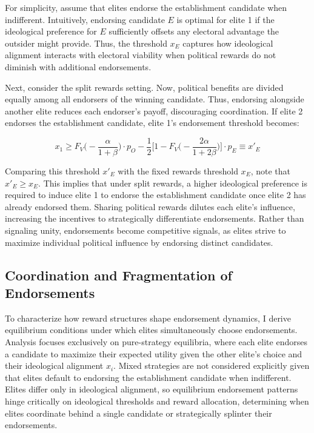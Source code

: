 For simplicity, assume that elites endorse the establishment candidate when indifferent. Intuitively, endorsing candidate $E$ is optimal for elite 1 if the ideological preference for $E$ sufficiently offsets any electoral advantage the outsider might provide. Thus, the threshold $x_E$ captures how ideological alignment interacts with electoral viability when political rewards do not diminish with additional endorsements.

Next, consider the split rewards setting. Now, political benefits are divided equally among all endorsers of the winning candidate. Thus, endorsing alongside another elite reduces each endorser’s payoff, discouraging coordination. If elite 2 endorses the establishment candidate, elite 1’s endorsement threshold becomes:

\[x_1 \geq F_V\bigg(-\frac{\alpha}{1+\beta}\bigg)\cdot p_O - \frac{1}{2}\bigg[1- F_V\bigg(-\frac{2\alpha}{1+2\beta}\bigg)\bigg]\cdot p_E \equiv x'_E \]

Comparing this threshold $x'_E$ with the fixed rewards threshold $x_E$, note that $x'_E \geq x_E$. This implies that under split rewards, a higher ideological preference is required to induce elite 1 to endorse the establishment candidate once elite 2 has already endorsed them. Sharing political rewards dilutes each elite’s influence, increasing the incentives to strategically differentiate endorsements. Rather than signaling unity, endorsements become competitive signals, as elites strive to maximize individual political influence by endorsing distinct candidates.

\subsection*{Coordination and Fragmentation of Endorsements}
To characterize how reward structures shape endorsement dynamics, I derive equilibrium conditions under which elites simultaneously choose endorsements. Analysis focuses exclusively on pure-strategy equilibria, where each elite endorses a candidate to maximize their expected utility given the other elite’s choice and their ideological alignment $x_i$. Mixed strategies are not considered explicitly given that elites default to endorsing the establishment candidate when indifferent. Elites differ only in ideological alignment, so equilibrium endorsement patterns hinge critically on ideological thresholds and reward allocation, determining when elites coordinate behind a single candidate or strategically splinter their endorsements.

